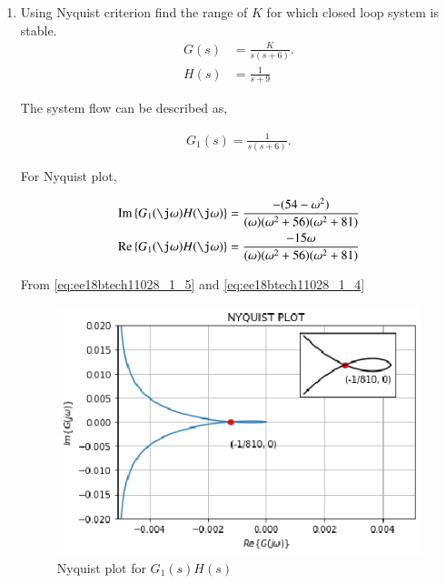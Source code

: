 \begin{enumerate}[label=\thesection.\arabic*.,ref=\thesection.\theenumi]
\item Using Nyquist criterion find the range of $K$ for which closed loop system is stable.
\begin{align}
    G(s) &= \frac{K}{s(s+6)}. 
    \label{eq:ee18btech11028_1_1}
\\
    H(s) &= \frac{1}{s+9}
    \label{eq:ee18btech11028_1_2}
\end{align}

\solution
The system flow can be described as,

\begin{figure}[!ht]
    \begin{center}
        \resizebox{\columnwidth}{!}{}
    \end{center}
    \caption{}  
    \label{fig:ee18btech11028_1_fig1}
\end{figure}


\begin{align}
    G_{1}(s) = \frac{1}{s(s+6)}. 
    \label{eq:ee18btech11028_1_3}
\end{align}

For Nyquist plot, 

\begin{align}
    \text{Im} \cbrak{G_{1}(\j \omega)H(\j \omega)} &= \frac{-(54 - \omega^{2})}{(\omega)(\omega^{2}+56)(\omega^{2} + 81)}
    \label{eq:ee18btech11028_1_5}
\\
    \text{Re} \cbrak{G_{1}(\j \omega)H(\j \omega)} &= \frac{-15 \omega}{(\omega)(\omega^{2}+56)(\omega^{2} + 81)}
    \label{eq:ee18btech11028_1_4}
\end{align}

From \eqref{eq:ee18btech11028_1_5} and \eqref{eq:ee18btech11028_1_4}

\begin{figure}[!h]
\includegraphics[width=\columnwidth]{./figs/ee18btech11028/ee18btech11028_1.eps}
    \centering
  \caption{Nyquist plot for $G_{1}(s)H(s)$}
  \label{fig:ee18btech11028_1_fig2}
\end{figure}



\end{enumerate}
